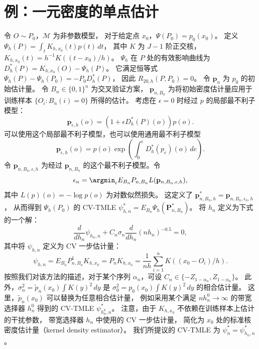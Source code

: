 \section{例：一元密度的单点估计}

令 $O\sim P_0$，$\mathcal M$ 为非参数模型，
对于给定点 $x_0$，$\Psi(P_0)=p_0(x_0)$。
定义 $\Psi_h(P)=\int_tK_{h,x_0}(t)p(t)\,dt$，
其中 $K$ 为 $J-1$ 阶正交核，
$K_{h,x_0}(t)=h^{-1}K((t-x_0)/h)$。
$\Psi_h$ 在 $P$ 处的有效影响曲线为
$D_h^*(P)=K_{h,x_0}(O)-\Psi_h(P)$。
它满足恒等式
$\Psi_h(P)-\Psi_h(P_0)=-P_0D_h^*(P)$，
因此 $R_{20,h}(P,P_0)=0$。
令 $\mathbf p_n$ 为 $p_0$ 的初始估计量。
令 $B_n\in\{0,1\}^n$ 为交叉验证方案，
$\mathbf p_{n,B_n}$ 为将初始密度估计量应用于训练样本
$\{O_i:B_n(i)=0\}$ 所得的估计。
考虑在 $\epsilon=0$ 时经过 $p$ 的局部最不利子模型：
\[
 \mathbf p_{\epsilon,h}(o)
 =(1+\epsilon D_h^*(P)(o))p(o).
\]
可以使用这个局部最不利子模型，也可以使用通用最不利子模型
\[
 \mathbf p_{\epsilon,h}(o)=p(o)
 \exp\left(\int_0^\epsilon D_h^*(p_e)(o)\,de\right).
\]
令 $\mathbf p_{n,B_n,\epsilon,h}$ 为经过
$\mathbf p_{n,B_n}$ 的这个最不利子模型。令
\[
 \epsilon_n=\argmin_\epsilon
 E_{B_n}P_{n,B_n}L(\mathbf p_{n,B_n,\epsilon,h}),
\]
其中 $L(p)(o)=-\log p(o)$ 为对数似然损失。
这定义了 $\mathbf p^*_{n,B_n,h}=\mathbf p_{n,B_n,\epsilon_n,h}$，
从而得到 $\Psi_h(P_0)$ 的 CV-TMLE
$\psi^*_{h,n}=E_{B_n}\Psi_h(\mathbf P^*_{n,B_n})$。
将 $h_n$ 定义为下式的一个解：
\begin{equation}
 \frac{d}{dh_n}\psi_{h_n,n}
 +C_n\sigma_n\frac{d}{dh_n}(nh_n)^{-0.5}=0,
\tag{25.11}
\end{equation}
其中将 $\psi_{h,n}$ 定义为 CV 一步估计量：
\[
 \psi_{h,n}=E_{B_n}P^1_{n,B_n}K_{h,x_0}
 =P_nK_{h,x_0}
 =\frac{1}{nh}\sum_{i=1}^{n}K((x_0-O_i)/h).
\]
按照我们对该方法的描述，对于某个序列 $\alpha_n$，可设
$C_n\in\{-Z_{1-\alpha_n},Z_{1-\alpha_n}\}$。
此外，$\sigma_n^2=\tilde p_n(x_0)\int K(y)^2\,dy$
是 $\sigma_0^2=p_0(x_0)\int K(y)^2\,dy$ 的相合估计量。
这里，$\tilde p_n(x_0)$ 可以替换为任意相合估计量，
例如采用某个满足 $nh_n^0\to\infty$ 的带宽选择器 $h_n^0$
得到的 CV-TMLE $\psi^*_{h_n^0,n}$。
注意，由于 $K_{h,x_0}$ 不依赖在训练样本上估计的干扰参数，
带宽选择器 $h_n$ 中使用的 CV 一步估计量，
简化为 $x_0$ 处的标准核密度估计量（kernel density estimator）。
我们所提议的 CV-TMLE 为 $\psi_n^*=\psi^*_{h_n,n}$。

